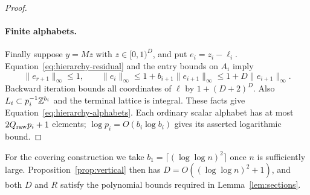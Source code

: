 \begin{proof}
\paragraph{Finite alphabets.}
Finally suppose $y=Mz$ with $z\in[0,1)^D$, and put $e_i=z_i-\ell_i$.
Equation~\eqref{eq:hierarchy-residual} and the entry bounds on $A_i$ imply
\[
 \|e_{r+1}\|_\infty\le1,\qquad
 \|e_i\|_\infty\le1+b_{i+1}\|e_{i+1}\|_\infty
                   \le1+D\|e_{i+1}\|_\infty.
\]
Backward iteration bounds all coordinates of $\ell$ by
$1+(D+2)^D$.  Also $L_i\subset p_i^{-1}\mathbb Z^{b_i}$ and the terminal
lattice is integral.  These facts give Equation~\eqref{eq:hierarchy-alphabets}.
Each ordinary scalar alphabet has at most $2Q_{\rm raw}p_i+1$ elements;
$\log p_i=O(b_i\log b_i)$ gives its asserted logarithmic bound.
\end{proof}

For the covering construction we take
$b_1=\lceil(\log\log n)^2\rceil$ once $n$ is sufficiently large.
Proposition~\ref{prop:vertical} then has
$D=O((\log\log n)^2+1)$, and both $D$ and $R$ satisfy the polynomial
bounds required in Lemma~\ref{lem:sections}.

